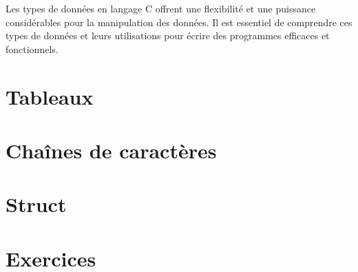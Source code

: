 Les types de données en langage C offrent une flexibilité et une puissance considérables pour la manipulation des données. Il est essentiel de comprendre ces types de données et leurs utilisations pour écrire des programmes efficaces et fonctionnels.

\section{Tableaux}
\section{Chaînes de caractères}
\section{Struct}

\section{Exercices}
